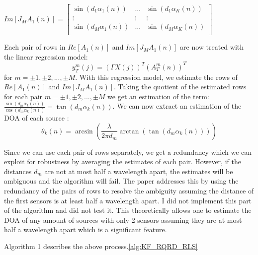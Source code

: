 \documentclass{article}
\begin{document}
$Im[J_M A_1(n)] = \begin{bmatrix}
    \sin(d_1\alpha_1(n)) & \dots & \sin(d_1\alpha_K(n)) \\
    \vdots & \vdots & \vdots \\
    \sin(d_M\alpha_1(n)) & \dots & \sin(d_M\alpha_K(n)) \\
\end{bmatrix}$
\vspace{1em}

Each pair of rows in $Re[A_1(n)]$ and $Im[J_M A_1(n)]$ are now treated with the linear regression model:
\begin{equation}
    y^m_T(j) = (\Gamma X(j))^T (A^m_T(n))^T
\end{equation}
for $m = \pm 1, \pm2, ..., \pm M$.
With this regression model, we estimate the rows of $Re[A_1(n)]$ and $Im[J_M A_1(n)]$.
Taking the quotient of the estimated rows for each pair $m=\pm1, \pm2, ..., \pm M$ we get an estimation of the term:
$\frac{\sin(d_m\alpha_k(n))}{\cos(d_m\alpha_k(n))} = \tan(d_m\alpha_k(n))$.
We can now extract an estimation of the DOA of each source :
\begin{equation}
    \theta_k(n) = \arcsin{(\frac{\lambda}{2\pi d_m} \arctan{(\tan(d_m\alpha_k(n)))})}
\end{equation}

Since we can use each pair of rows separately, we get a redundancy which we can exploit for robustness by averaging the estimates of each pair.
However, if the distances $d_m$ are not at most half a wavelength apart, the estimates will be ambiguous and the algorithm will fail.
The paper addresses this by using the redundancy of the pairs of rows to resolve the ambiguity assuming the distance of the first sensors is at least half
a wavelength apart. I did not implement this part of the algorithm and did not test it.
This theoretically allows one to estimate the DOA of any amount of sources with only 2 sensors assuming they are at most half a wavelength apart which is a significant feature.

Algorithm 1 describes the above process.\ref*{alg:KF_RQRD_RLS}
\end{document}
